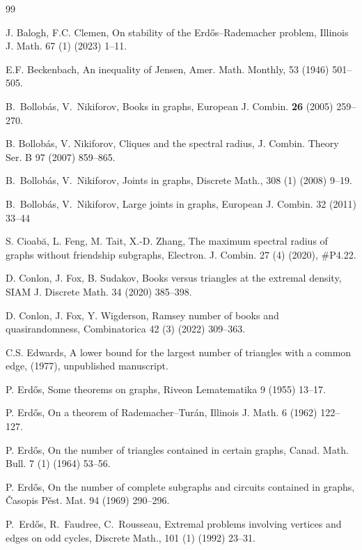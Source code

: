 \documentclass[11pt,a4paper]{article}
\theoremstyle{definition}
\theoremstyle{plain}
\begin{document}
\begin{thebibliography}{99}

 J. Balogh, F.C. Clemen, 
 On stability of the Erd\H{o}s--Rademacher problem, 
 Illinois J. Math. 67 (1) (2023) 1--11.
 
  E.F. Beckenbach, An inequality of Jensen, 
  Amer. Math. Monthly, 53 (1946) 501--505.
 
B.~Bollob\'as, V.~Nikiforov,
Books in graphs,
{European J. Combin.} \textbf{26} (2005) 259--270.

B. Bollob\'as, V. Nikiforov,
Cliques and the spectral radius,
{J. Combin. Theory Ser. B} 97 (2007) 859--865.

B.~Bollob{\'a}s, V.~Nikiforov, 
Joints in graphs, 
Discrete Math., 308 (1) (2008) 9--19.


B.~Bollob{\'a}s, V.~Nikiforov, 
Large joints in graphs, 
European J. Combin. 32 (2011) 33--44

 S. Cioab\u{a}, L. Feng, M. Tait, X.-D. Zhang, 
The maximum spectral radius of graphs without friendship subgraphs, 
 Electron. J. Combin. 27 (4) (2020), \#P4.22.

D. Conlon, J. Fox, B. Sudakov, Books versus triangles at the extremal density, SIAM J. Discrete Math. 34 (2020) 385--398. 

D. Conlon, J. Fox, Y. Wigderson, Ramsey number of books and quasirandomness, Combinatorica 42 (3) (2022) 309--363.

C.S. Edwards, A lower bound for the largest number of triangles with a common edge, (1977),  unpublished manuscript.
 

P. Erd\H{o}s, Some theorems on graphs,
Riveon Lematematika 9 (1955) 13--17. 

 P. Erd\H{o}s, 
 On a theorem of Rademacher--Tur\'{a}n, 
 Illinois J. Math. 6 (1962) 122--127.

P. Erd\H{o}s,  
On the number of triangles contained in certain graphs, 
Canad. Math. Bull. 7 (1) (1964) 53--56. 

P. Erd\H{o}s, 
On the number of complete subgraphs and circuits contained in graphs, \v{C}asopis P\v{e}st. Mat. 94 (1969) 290--296.

P.~Erd\H{o}s, R.~Faudree, C.~Rousseau, 
Extremal problems involving vertices and edges on odd cycles,
{Discrete Math.}, 101 (1) (1992) 23--31.


\end{thebibliography}
\end{document}
